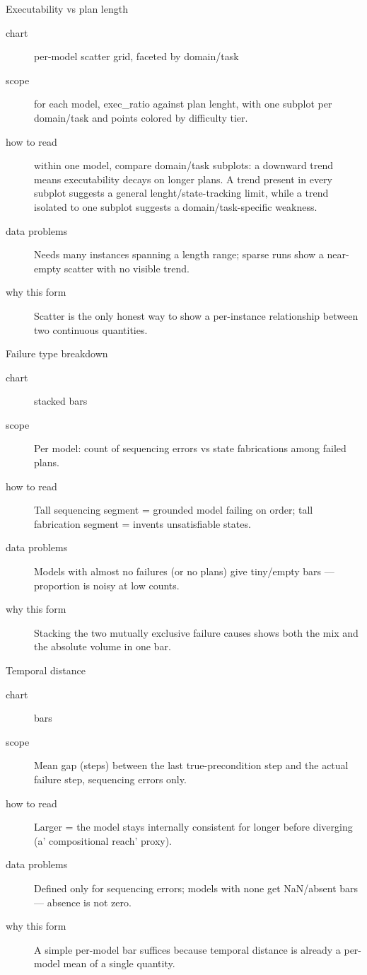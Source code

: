 \begin{bmplotcard}{Executability vs plan length}
\begin{description}
\item[chart] per-model scatter grid, faceted by domain/task
\item[scope] for each model, exec\_ratio against plan lenght, with one subplot per domain/task and points colored by difficulty tier.
\item[how to read] within one model, compare domain/task subplots: a downward trend means executability decays on longer plans. A trend present in every subplot suggests a general lenght/state-tracking limit, while a trend isolated to one subplot suggests a domain/task-specific weakness.
\item[data problems] Needs many instances spanning a length range; sparse runs show a near-empty scatter with no visible trend.
\item[why this form] Scatter is the only honest way to show a per-instance relationship between two continuous quantities.
\end{description}
\end{bmplotcard}

\begin{bmplotcard}{Failure type breakdown}
\begin{description}
\item[chart] stacked bars
\item[scope] Per model: count of sequencing errors vs state fabrications among failed plans.
\item[how to read] Tall sequencing segment = grounded model failing on order; tall fabrication segment = invents unsatisfiable states.
\item[data problems] Models with almost no failures (or no plans) give tiny/empty bars --- proportion is noisy at low counts.
\item[why this form] Stacking the two mutually exclusive failure causes shows both the mix and the absolute volume in one bar.
\end{description}
\end{bmplotcard}

\begin{bmplotcard}{Temporal distance}
\begin{description}
\item[chart] bars
\item[scope] Mean gap (steps) between the last true-precondition step and the actual failure step, sequencing errors only.
\item[how to read] Larger = the model stays internally consistent for longer before diverging (a' compositional reach' proxy).
\item[data problems] Defined only for sequencing errors; models with none get NaN/absent bars --- absence is not zero.
\item[why this form] A simple per-model bar suffices because temporal distance is already a per-model mean of a single quantity.
\end{description}
\end{bmplotcard}

